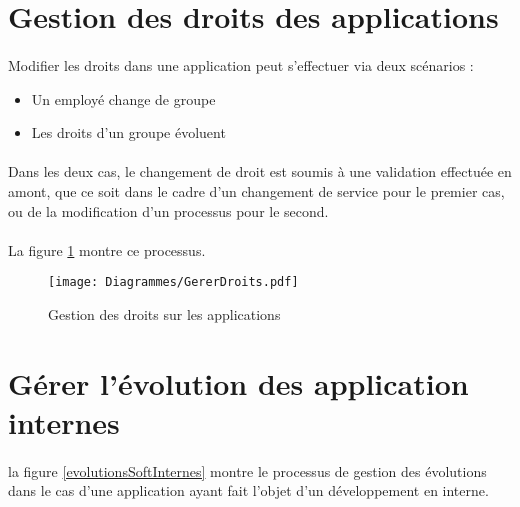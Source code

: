\section{Gestion des droits des applications}

\paragraph{} Modifier les droits dans une application peut s'effectuer via deux scénarios : \begin{itemize}
	\item Un employé change de groupe
	\item Les droits d'un groupe évoluent
\end{itemize}

\paragraph{} Dans les deux cas, le changement de droit est soumis à une validation effectuée en amont, que ce soit dans le cadre d'un changement de service pour le premier cas, ou de la modification d'un processus pour le second.
\paragraph{} La figure \ref{gestionDroits} montre ce processus.


\begin{figure}
	\centering
	\texttt{[image: Diagrammes/GererDroits.pdf]}
	\caption{Gestion des droits sur les applications}
	\label{gestionDroits}
\end{figure}



\section{Gérer l'évolution des application internes}



\paragraph{} la figure \ref{evolutionsSoftInternes} montre le processus de gestion des évolutions dans le cas d'une application ayant fait l'objet d'un développement en interne.
